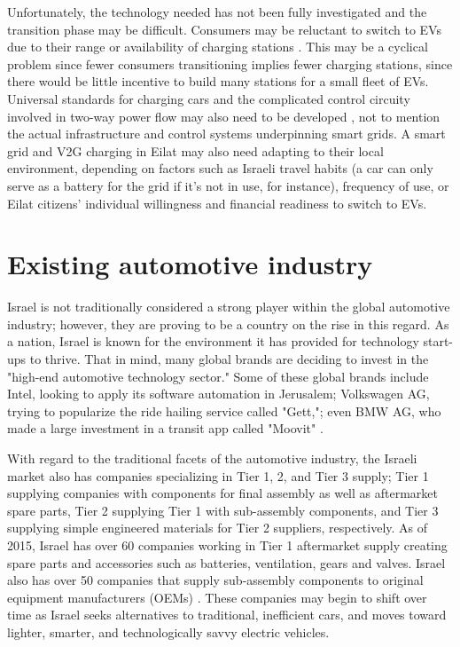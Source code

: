 \documentclass{report}                         %
\begin{document}
Unfortunately, the technology needed has not been fully investigated and the transition phase may be difficult. Consumers may be reluctant to switch to EVs due to their range or availability of charging stations \cite{Zhu2015DistributedGrid}. This may be a cyclical problem since fewer consumers transitioning implies fewer charging stations, since there would be little incentive to build many stations for a small fleet of EVs. Universal standards for charging cars and the complicated control circuity involved in two-way power flow may also need to be developed \cite{Ustun2015ImpactSystems, Yeshayahou2011IsraelCharging}, not to mention the actual infrastructure and control systems underpinning smart grids. A smart grid and V2G charging in Eilat may also need adapting to their local environment, depending on factors such as Israeli travel habits (a car can only serve as a battery for the grid if it's not in use, for instance), frequency of use, or Eilat citizens' individual willingness and financial readiness to switch to EVs.

\section{Existing automotive industry}
Israel is not traditionally considered a strong player within the global automotive industry; however, they are proving to be a country on the rise in this regard. As a nation, Israel is known for the environment it has provided for technology start-ups to thrive. That in mind, many global brands are deciding to invest in the "high-end automotive technology sector." Some of these global brands include Intel, looking to apply its software automation in Jerusalem; Volkswagen AG, trying to popularize the ride hailing service called "Gett,"; even BMW AG, who made a large investment in a transit app called "Moovit" \cite{Coutinho2018IsraelIndustry}. 

With regard to the traditional facets of the automotive industry, the Israeli market also has companies specializing in Tier 1, 2, and Tier 3 supply; Tier 1 supplying companies with components for final assembly as well as aftermarket spare parts, Tier 2 supplying Tier 1 with sub-assembly components, and Tier 3 supplying simple engineered materials for Tier 2 suppliers, respectively. As of 2015, Israel has over 60 companies working in Tier 1 aftermarket supply creating spare parts and accessories such as batteries, ventilation, gears and valves. Israel also has over 50 companies that supply sub-assembly components to original equipment manufacturers (OEMs) \cite{MinistryofEconomyandIndustryStateofIsraelTheIsrael}. These companies may begin to shift over time as Israel seeks alternatives to traditional, inefficient cars, and moves toward lighter, smarter, and technologically savvy electric vehicles.
\end{document}
